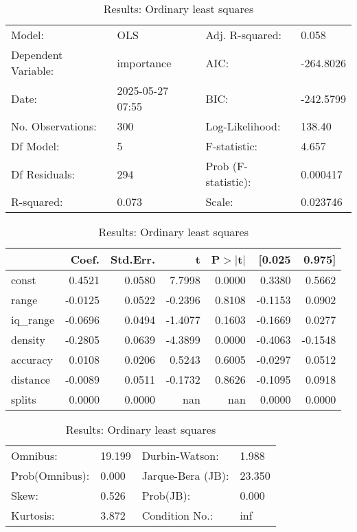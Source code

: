 \begin{table}
\caption{Results: Ordinary least squares}
\label{}
\begin{center}
\begin{tabular}{llll}
\hline
Model:              & OLS              & Adj. R-squared:     & 0.058      \\
Dependent Variable: & importance       & AIC:                & -264.8026  \\
Date:               & 2025-05-27 07:55 & BIC:                & -242.5799  \\
No. Observations:   & 300              & Log-Likelihood:     & 138.40     \\
Df Model:           & 5                & F-statistic:        & 4.657      \\
Df Residuals:       & 294              & Prob (F-statistic): & 0.000417   \\
R-squared:          & 0.073            & Scale:              & 0.023746   \\
\hline
\end{tabular}
\end{center}

\begin{center}
\begin{tabular}{lrrrrrr}
\hline
          &   Coef. & Std.Err. &       t & P$> |$t$|$ &  [0.025 &  0.975]  \\
\hline
const     &  0.4521 &   0.0580 &  7.7998 &      0.0000 &  0.3380 &  0.5662  \\
range     & -0.0125 &   0.0522 & -0.2396 &      0.8108 & -0.1153 &  0.0902  \\
iq\_range & -0.0696 &   0.0494 & -1.4077 &      0.1603 & -0.1669 &  0.0277  \\
density   & -0.2805 &   0.0639 & -4.3899 &      0.0000 & -0.4063 & -0.1548  \\
accuracy  &  0.0108 &   0.0206 &  0.5243 &      0.6005 & -0.0297 &  0.0512  \\
distance  & -0.0089 &   0.0511 & -0.1732 &      0.8626 & -0.1095 &  0.0918  \\
splits    &  0.0000 &   0.0000 &     nan &         nan &  0.0000 &  0.0000  \\
\hline
\end{tabular}
\end{center}

\begin{center}
\begin{tabular}{llll}
\hline
Omnibus:       & 19.199 & Durbin-Watson:    & 1.988   \\
Prob(Omnibus): & 0.000  & Jarque-Bera (JB): & 23.350  \\
Skew:          & 0.526  & Prob(JB):         & 0.000   \\
Kurtosis:      & 3.872  & Condition No.:    & inf     \\
\hline
\end{tabular}
\end{center}
\end{table}
